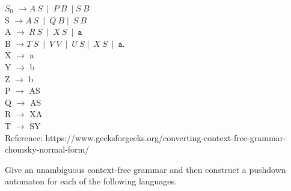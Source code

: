 \documentclass[a4page]{exam}
\newcommand{\Str}[1]{\mathtt{#1}}
\begin{document}
\begin{questions}
$S_{0}$ $\rightarrow A \ S \ \mid \ P \ B \ \mid S \ B $\\
S $\rightarrow A\ S\ \mid \ Q \ B \mid \ S \ B   $\\
    A $\rightarrow \ R\ S\ \mid\  X \ S \ \mid\ \Str{a}$ \\
    B $\rightarrow T \ S\ \mid\ V\ V\ \mid \ U \ S \mid \ X \ S \ \mid \ \Str{a}$.\\
X $\rightarrow$ a\\
Y $\rightarrow$ b\\
Z $\rightarrow$ b\\
P $\rightarrow$ AS\\
Q $\rightarrow$ AS\\
R $\rightarrow$ XA\\
T $\rightarrow$ SY\\


Reference: https://www.geeksforgeeks.org/converting-context-free-grammar-chomsky-normal-form/

\question Give an unambiguous context-free grammar and then construct a pushdown automaton for each of the following languages.
\end{questions}
\end{document}
